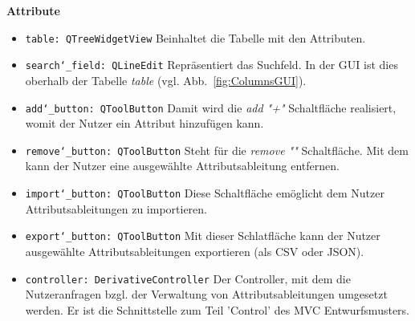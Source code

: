 \documentclass{article}
\begin{document}
\textbf{{Attribute}}
\begin{itemize}
\item \texttt{table: QTreeWidgetView} \newline Beinhaltet die Tabelle mit den Attributen.
\item \texttt{search\char`_field: QLineEdit} \newline Repräsentiert das Suchfeld. In der GUI ist dies oberhalb der Tabelle \textit{table} (vgl. Abb.~\ref{fig:ColumnsGUI}).
\item \texttt{add\char`_button: QToolButton} \newline Damit wird die \textit{add "+"} Schaltfläche realisiert, womit der Nutzer ein Attribut hinzufügen kann.
\item \texttt{remove\char`_button: QToolButton} \newline Steht für die \textit{remove "\textendash"} Schaltfläche. Mit dem kann der Nutzer eine ausgewählte Attributsableitung entfernen. 
\item \texttt{import\char`_button: QToolButton} \newline Diese Schaltfläche emöglicht dem Nutzer Attributsableitungen zu importieren.
\item \texttt{export\char`_button: QToolButton} \newline Mit dieser Schlatfläche kann der Nutzer ausgewählte Attributsableitungen exportieren (als CSV oder JSON).
\item \texttt{controller: DerivativeController} \newline Der Controller, mit dem die Nutzeranfragen bzgl. der Verwaltung von Attributsableitungen umgesetzt werden. Er ist die Schnittstelle zum Teil 'Control' des MVC Entwurfsmusters.
\end{itemize}
\end{document}
